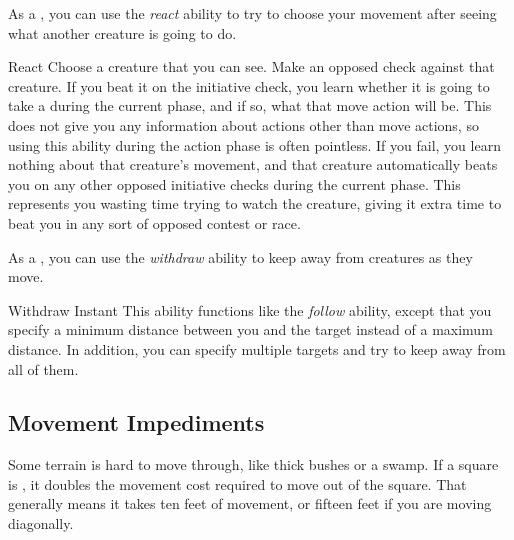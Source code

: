          As a , you can use the \textit{react} ability to try to choose your movement after seeing what another creature is going to do.

        \begin{instantability}{React}
            \label{React}
            \rankline
            Choose a creature that you can see.
            Make an opposed  check against that creature.
            If you beat it on the initiative check, you learn whether it is going to take a  during the current phase, and if so, what that move action will be.
            This does not give you any information about actions other than move actions, so using this ability during the action phase is often pointless.
            If you fail, you learn nothing about that creature's movement, and that creature automatically beats you on any other opposed initiative checks during the current phase.
            This represents you wasting time trying to watch the creature, giving it extra time to beat you in any sort of opposed contest or race.
        \end{instantability}

         As a , you can use the \textit{withdraw} ability to keep away from creatures as they move.

        \begin{instantability}{Withdraw}
            \label{Withdraw}
            Instant
            \rankline
            This ability functions like the \textit{follow} ability, except that you specify a minimum distance between you and the target instead of a maximum distance.
            In addition, you can specify multiple targets and try to keep away from all of them.
        \end{instantability}

    \subsection{Movement Impediments}

        \label{Difficult Terrain}
        Some terrain is hard to move through, like thick bushes or a swamp.
        If a square is , it doubles the movement cost required to move out of the square.
        That generally means it takes ten feet of movement, or fifteen feet if you are moving diagonally.

